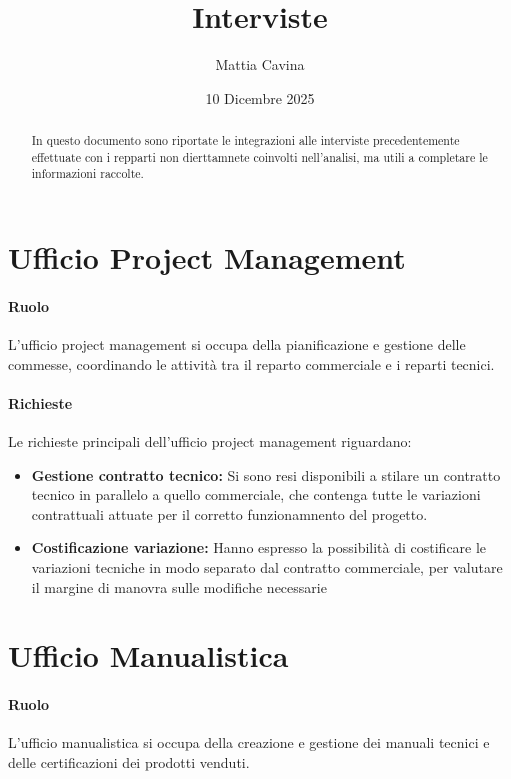 \documentclass[12pt, a4paper]{article} %
\title{Interviste}
\author{Mattia Cavina}
\date{10 Dicembre 2025}
\begin{document}
 

\maketitle
\begin{abstract} 
      In questo documento sono riportate le integrazioni alle interviste
      precedentemente effettuate con i repparti non dierttamnete coinvolti nell'analisi,
      ma utili a completare le informazioni raccolte.
\end{abstract}
\section{Ufficio Project Management}
\paragraph{Ruolo}
L'ufficio project management si occupa della pianificazione e gestione delle
commesse, coordinando le attività tra il reparto commerciale e i reparti
tecnici.
\paragraph{Richieste}
Le richieste principali dell'ufficio project management riguardano:
\begin{itemize}
      \item \textbf{Gestione contratto tecnico:} Si sono resi disponibili a stilare un contratto tecnico in parallelo a quello commerciale, che contenga tutte le variazioni contrattuali attuate per il corretto funzionamnento del progetto.
      \item \textbf{Costificazione variazione:} Hanno espresso la possibilità di costificare le variazioni tecniche in modo separato dal contratto commerciale, per valutare il margine di manovra sulle modifiche necessarie
\end{itemize}

\section{Ufficio Manualistica}
\paragraph{Ruolo}
L'ufficio manualistica si occupa della creazione e gestione dei manuali tecnici
e delle certificazioni dei prodotti venduti.
\end{document}
